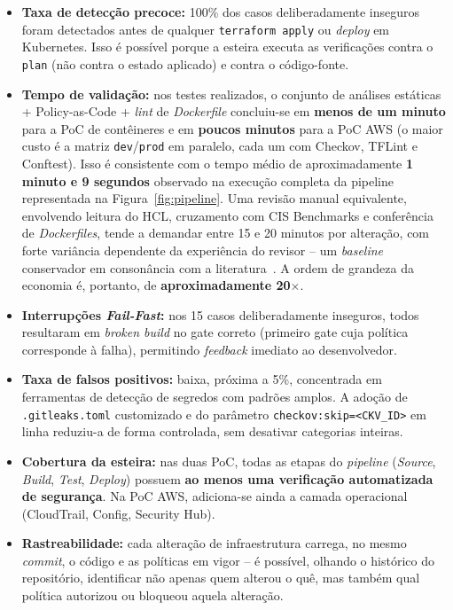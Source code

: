 \begin{itemize}
    \item \textbf{Taxa de detecção precoce:} 100\% dos casos deliberadamente inseguros foram detectados antes de qualquer \texttt{terraform apply} ou \textit{deploy} em Kubernetes. Isso é possível porque a esteira executa as verificações contra o \texttt{plan} (não contra o estado aplicado) e contra o código-fonte.
    \item \textbf{Tempo de validação:} nos testes realizados, o conjunto de análises estáticas + Policy-as-Code + \textit{lint} de \textit{Dockerfile} concluiu-se em \textbf{menos de um minuto} para a PoC de contêineres e em \textbf{poucos minutos} para a PoC AWS (o maior custo é a matriz \texttt{dev}/\texttt{prod} em paralelo, cada um com Checkov, TFLint e Conftest). Isso é consistente com o tempo médio de aproximadamente \textbf{1 minuto e 9 segundos} observado na execução completa da pipeline representada na Figura~\ref{fig:pipeline}. Uma revisão manual equivalente, envolvendo leitura do HCL, cruzamento com CIS Benchmarks e conferência de \textit{Dockerfiles}, tende a demandar entre 15 e 20 minutos por alteração, com forte variância dependente da experiência do revisor -- um \textit{baseline} conservador em consonância com a literatura~. A ordem de grandeza da economia é, portanto, de \textbf{aproximadamente 20$\times$}.
    \item \textbf{Interrupções \textit{Fail-Fast}:} nos 15 casos deliberadamente inseguros, todos resultaram em \textit{broken build} no gate correto (primeiro gate cuja política corresponde à falha), permitindo \textit{feedback} imediato ao desenvolvedor.
    \item \textbf{Taxa de falsos positivos:} baixa, próxima a 5\%, concentrada em ferramentas de detecção de segredos com padrões amplos. A adoção de \texttt{.gitleaks.toml} customizado e do parâmetro \texttt{checkov:skip=<CKV\_ID>} em linha reduziu-a de forma controlada, sem desativar categorias inteiras.
    \item \textbf{Cobertura da esteira:} nas duas PoC, todas as etapas do \textit{pipeline} (\textit{Source}, \textit{Build}, \textit{Test}, \textit{Deploy}) possuem \textbf{ao menos uma verificação automatizada de segurança}. Na PoC AWS, adiciona-se ainda a camada operacional (CloudTrail, Config, Security Hub).
    \item \textbf{Rastreabilidade:} cada alteração de infraestrutura carrega, no mesmo \textit{commit}, o código e as políticas em vigor -- é possível, olhando o histórico do repositório, identificar não apenas quem alterou o quê, mas também qual política autorizou ou bloqueou aquela alteração.
\end{itemize}

